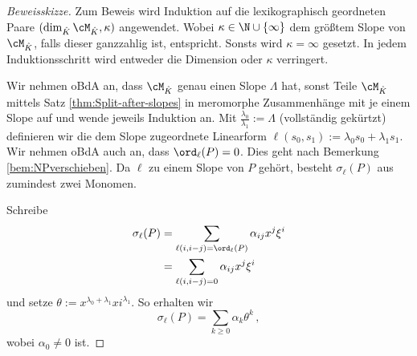 \begin{proof}[Beweisskizze]
Zum Beweis wird Induktion auf die lexikographisch geordneten Paare
\linebreak
$(\dim_{\hat K}\cM_{\hat K},\kappa)$ angewendet. Wobei
$\kappa\in\N\cup\{\infty\}$ dem größtem Slope von $\cM_{\hat K}$, falls dieser
ganzzahlig ist, entspricht. Sonsts wird $\kappa=\infty$ gesetzt. In jedem
Induktionsschritt wird entweder die Dimension oder $\kappa$ verringert.

\begin{comment}
TODO: Induktionsanfang und -schritt kennzeichnen
\end{comment}
Wir nehmen oBdA an, dass $\cM_{\hat K}$ genau einen Slope $\Lambda$ hat, sonst
Teile $\cM_{\hat K}$ mittels Satz \ref{thm:Split-after-slopes} in meromorphe
Zusammenhänge mit je einem Slope auf und wende jeweils Induktion an.
Mit $\frac{\lambda_0}{\lambda_1}:=\Lambda$ (vollständig gekürtzt) definieren
wir die dem Slope zugeordnete Linearform
\linebreak
$\ell(s_0,s_1):=\lambda_0s_0+\lambda_1s_1$.  
Wir nehmen oBdA auch an, dass $\ord_\ell(P)=0$. Dies geht nach Bemerkung
\ref{bem:NPverschieben}.
Da $\ell$ zu einem Slope von
$P$ gehört, besteht $\sigma_\ell(P)$ aus zumindest zwei Monomen.

\pagebreak
Schreibe
\begin{align*}
\sigma_\ell(P)&=\sum_{\ell(i,i-j)=\ord_\ell(P)}\alpha_{ij}x^j\xi^i\\
  &=\sum_{\ell(i,i-j)=0}\alpha_{ij}x^j\xi^i
\end{align*}
und setze $\theta:=x^{\lambda_0+\lambda_1}xi^{\lambda_1}$. So erhalten wir
\[
\sigma_\ell(P) = \sum_{k\geq 0}\alpha_k\theta^k \,,
\]
wobei $\alpha_0\neq0$ ist.


\end{proof}

